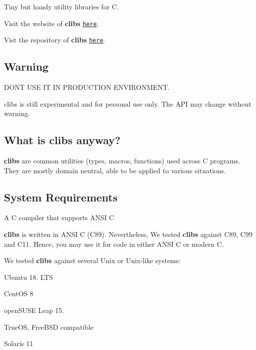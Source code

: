 \href{https://opensource.org/licenses/MIT}{\tt } \href{https://travis-ci.org/cwchentw/clibs}{\tt }

Tiny but handy utility libraries for C.

Visit the website of {\bfseries clibs} \href{https://cwchentw.github.io/clibs/html/index.html}{\tt here}.

Vist the repository of {\bfseries clibs} \href{https://github.com/cwchentw/clibs/}{\tt here}.

\subsection*{Warning}

D\+ON\textquotesingle{}T U\+SE IT IN P\+R\+O\+D\+U\+C\+T\+I\+ON E\+N\+V\+I\+R\+O\+N\+M\+E\+NT.

clibs is still experimental and for personal use only. The A\+PI may change without warning.

\subsection*{What is clibs anyway?}

{\bfseries clibs} are common utilities (types, macros, functions) used across C programs. They are mostly domain neutral, able to be applied to various situations.

\subsection*{System Requirements}


\begin{DoxyItemize}
\item A C compiler that supports A\+N\+SI C
\end{DoxyItemize}

{\bfseries clibs} is written in A\+N\+SI C (C89). Nevertheless, We tested {\bfseries clibs} against C89, C99 and C11. Hence, you may use it for code in either A\+N\+SI C or modern C.

We tested {\bfseries clibs} against several Unix or Unix-\/like systems\+:


\begin{DoxyItemize}
\item Ubuntu 18. L\+TS
\item Cent\+OS 8
\item open\+S\+U\+SE Leap 15.
\item True\+OS, Free\+B\+SD compatible
\item Solaris 11
\end{DoxyItemize}

